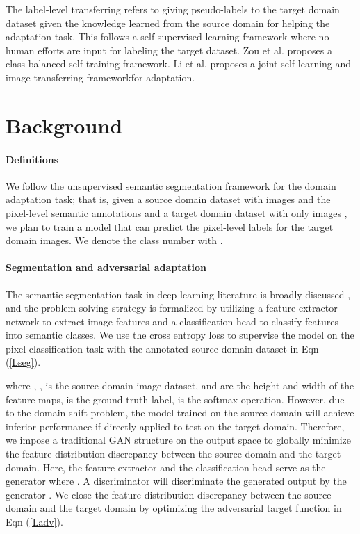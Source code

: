 \documentclass[10pt,twocolumn,letterpaper]{article}
\begin{document}
The label-level transferring refers to giving pseudo-labels to the target domain dataset given the knowledge learned from the source domain for helping the adaptation task. This follows a self-supervised learning framework \cite{selfsurvey} where no human efforts are input for labeling the target dataset. Zou et al. \cite{Zou_2018_ECCV} proposes a class-balanced self-training framework. Li et al. \cite{bidir} proposes a joint self-learning and image transferring frameworkfor adaptation. 

\vspace{-3mm}

\section{Background}
\label{section31}

\paragraph{Definitions}
We follow the unsupervised semantic segmentation framework for the domain adaptation task; that is, given a source domain dataset with images and the pixel-level semantic annotations  and a target domain dataset with only images , we plan to train a model that can predict the pixel-level labels  for the target domain images. We denote the class number with . 
\vspace{-4mm}
\paragraph{Segmentation and adversarial adaptation}
The semantic segmentation task in deep learning literature is broadly discussed \cite{deeplabv1, deeplabv2, pspnet, deeplabv3}, and the problem solving strategy is formalized by utilizing a feature extractor network  to extract image features and a classification head  to classify features into semantic classes. We use the cross entropy loss to supervise the model on the pixel classification task with the annotated source domain dataset in Eqn (\ref{Lseg}). 

where , ,  is the source domain image dataset,  and  are the height and width of the feature maps,  is the ground truth label,  is the softmax operation. However, due to the domain shift problem, the model trained on the source domain will achieve inferior performance if directly applied to test on the target domain. Therefore, we impose a traditional GAN structure on the output space \cite{outputspace} to globally minimize the feature distribution discrepancy between the source domain and the target domain. Here, the feature extractor  and the classification head  serve as the generator  where . A discriminator  will discriminate the generated output by the generator . We close the feature distribution discrepancy between the source domain and the target domain by optimizing the adversarial target function in Eqn (\ref{Ladv}).
\vspace{-2mm}
\end{document}
